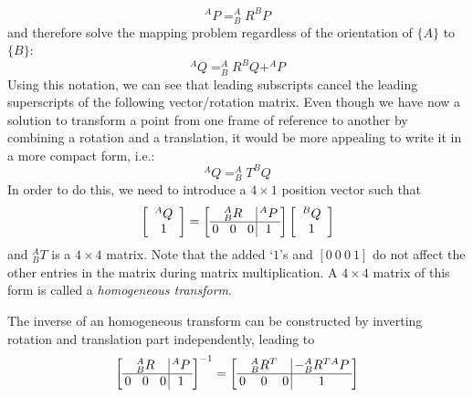 \begin{equation}
^AP=^A_BR^BP
\end{equation}
%
and therefore solve the mapping problem regardless of the orientation of $\{A\}$ to $\{B\}$:
\begin{equation}
^AQ=^A_BR^BQ+^AP
\end{equation}
Using this notation, we can see that leading subscripts cancel the leading superscripts of the following vector/rotation matrix.
Even though we have now a solution to transform a point from one frame of reference to another by combining a rotation and a translation, it would be more appealing to write it in a more compact form, i.e.:
\begin{equation}
^AQ=^A_BT^BQ
\end{equation}
In order to do this, we need to introduce a $4\times1$ position vector such that
\begin{equation}
\left[\begin{array}{c}^AQ\\1\end{array}\right]=\left[\arraycolsep=2pt\begin{array}{ccc|c} & ^A_BR & & ^AP \\\hline 0 & 0 & 0 & 1\end{array}\right]\left[\begin{array}{c}^BQ\\1\end{array}\right]
\end{equation}
and $^A_BT$ is a $4\times4$ matrix.  Note that the added `$1$'s and $ [0\ 0\ 0\ 1]$ do not affect the other entries in the matrix during matrix multiplication. A $4\times4$ matrix of this form is called a \emph{homogeneous transform}.

The inverse of an homogeneous transform can be constructed by inverting rotation and translation part independently, leading to
\begin{equation}
\left[\arraycolsep=2pt\begin{array}{ccc|c} & ^A_BR & & ^AP \\\hline 0 & 0 & 0 & 1\end{array}\right]^{-1}=
\left[\arraycolsep=2pt\begin{array}{ccc|c} & ^A_BR^T & & -^A_B{R^T}{^AP} \\\hline 0 & 0 & 0 & 1\end{array}\right]
\end{equation}

